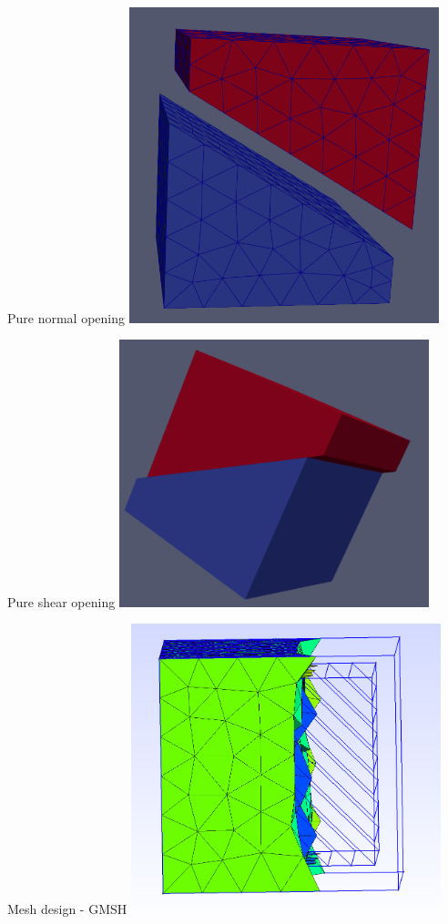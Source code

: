 \begin{frame}{Pure normal opening}
\includegraphics[width=9cm]{png/poromec-fracture-pure-normal}
\end{frame}

\begin{frame}{Pure shear opening}
\includegraphics[width=9cm]{png/poromec-fracture-pure-shear}
\end{frame}

\begin{frame}{Mesh design - GMSH}
\includegraphics[width=9cm]{png/poromec-fracture-media}
\end{frame}

